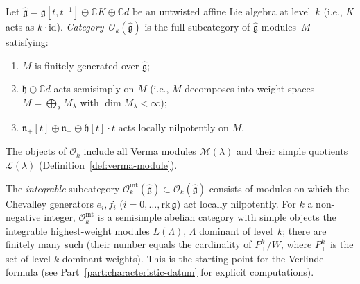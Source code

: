\begin{definition}
\label{def:category-O}
Let $\widehat{\mathfrak{g}} = \mathfrak{g}[t,t^{-1}] \oplus
\mathbb{C}K \oplus \mathbb{C}d$ be an untwisted affine Lie algebra at
level~$k$ (i.e., $K$ acts as $k \cdot \mathrm{id}$).
\emph{Category~$\mathcal{O}_k(\widehat{\mathfrak{g}})$} is the full
subcategory of $\widehat{\mathfrak{g}}$-modules~$M$ satisfying:
\begin{enumerate}[label=\textup{(\roman*)}]
\item $M$ is finitely generated over $\widehat{\mathfrak{g}}$;
\item $\mathfrak{h} \oplus \mathbb{C}d$ acts semisimply on $M$
 (i.e., $M$ decomposes into weight spaces
 $M = \bigoplus_{\lambda} M_\lambda$
 with $\dim M_\lambda < \infty$);
\item $\mathfrak{n}_+[t] \oplus \mathfrak{n}_+ \oplus
 \mathfrak{h}[t] \cdot t$ acts locally nilpotently on $M$.
\end{enumerate}
The objects of $\mathcal{O}_k$ include all Verma modules
$\mathcal{M}(\lambda)$ and their simple quotients
$\mathcal{L}(\lambda)$ (Definition~\ref{def:verma-module}).
\end{definition}

\begin{definition}
\label{def:integrable-modules}
The \emph{integrable} subcategory
$\mathcal{O}_k^{\mathrm{int}}(\widehat{\mathfrak{g}})
\subset \mathcal{O}_k(\widehat{\mathfrak{g}})$
consists of modules on which the Chevalley generators
$e_i, f_i$ ($i = 0, \ldots, \mathrm{rk}\,\mathfrak{g}$) act locally
nilpotently. For $k$ a non-negative integer,
$\mathcal{O}_k^{\mathrm{int}}$ is a semisimple abelian category with
simple objects the integrable highest-weight modules
$L(\Lambda)$, $\Lambda$ dominant of level~$k$; there are finitely many
such (their number equals the cardinality of $P^k_+ / W$, where
$P^k_+$ is the set of level-$k$ dominant weights). This is the
starting point for the Verlinde formula
(see Part~\ref{part:characteristic-datum} for explicit computations).
\end{definition}

